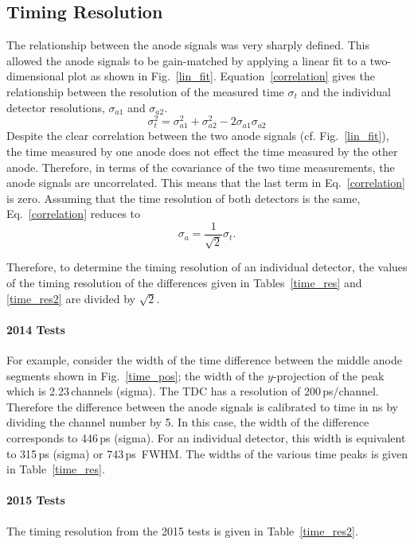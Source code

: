 \subsection{Timing Resolution}
The relationship between the anode signals was very sharply defined.  This allowed the anode signals to be gain-matched by applying a linear fit to a two-dimensional plot as shown in Fig.~\ref{lin_fit}.  
Equation~\ref{correlation} gives the relationship between the resolution 
 of the measured time $\sigma_{t}$ and the individual detector resolutions, $\sigma_{a1}$ and $\sigma_{a2}$.
\begin{equation}
\sigma_t^2=\sigma_{a1}^2+\sigma_{a2}^2-2\sigma_{a1}\sigma_{a2}
\label{correlation}
\end{equation}
Despite the clear correlation between the two anode signals (cf. Fig.~\ref{lin_fit}), the time measured by one anode does not effect the time measured by the other anode.  Therefore, in terms of the covariance of the two time measurements, the anode signals are uncorrelated.  This means that the last term in Eq.~\ref{correlation} is zero.  Assuming that the time resolution of both detectors is the same, Eq.~\ref{correlation} reduces to
\begin{equation}
  \sigma_{a}=\frac{1}{\sqrt{2}}\sigma_{t}.
\end{equation}

Therefore, to determine the timing resolution of an individual detector, the values of the timing resolution of the differences given in Tables~\ref{time_res} and \ref{time_res2} are divided by $\sqrt{2}$.
\paragraph{2014 Tests} 
For example, consider the width of the time difference  between the middle anode segments shown in Fig.~\ref{time_pos}; the width of the $y$-projection of the peak which is 2.23\,channels (sigma).  The TDC has a resolution of 200\,ps/channel.  Therefore the difference between the anode signals is calibrated to time in ns by dividing the channel number by 5.  In this case, the width of the difference corresponds to 446\,ps (sigma).  For an individual detector, this width is equivalent to 315\,ps (sigma) or 743\,ps~FWHM. The widths of the various time peaks is given in Table~\ref{time_res}.

\paragraph{2015 Tests} 
The timing resolution from the 2015 tests is given in Table~\ref{time_res2}.


